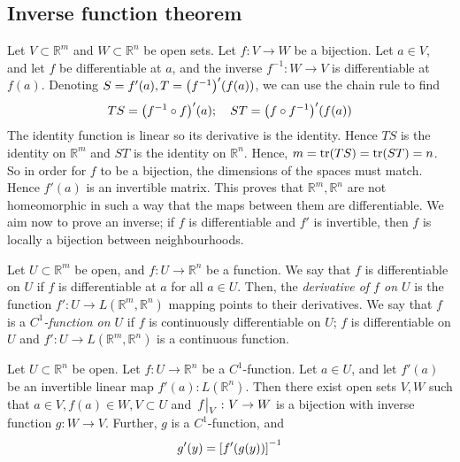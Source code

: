 \subsection{Inverse function theorem}
\begin{remark}
	Let \( V \subset \mathbb R^m \) and \( W \subset \mathbb R^n \) be open sets.
	Let \( f \colon V \to W \) be a bijection.
	Let \( a \in V \), and let \( f \) be differentiable at \( a \), and the inverse \( f^{-1} \colon W \to V \) is differentiable at \( f(a) \).
	Denoting \( S = f'(a), T = \qty(f^{-1})'(f(a)) \), we can use the chain rule to find
	\[
		TS = \qty(f^{-1} \circ f)'(a);\quad ST = \qty(f \circ f^{-1})'(f(a))
	\]
	The identity function is linear so its derivative is the identity.
	Hence \( TS \) is the identity on \( \mathbb R^m \) and \( ST \) is the identity on \( \mathbb R^n \).
	Hence, \( m = \tr(TS) = \tr(ST) = n \).
	So in order for \( f \) to be a bijection, the dimensions of the spaces must match.
	Hence \( f'(a) \) is an invertible matrix.
	This proves that \( \mathbb R^m, \mathbb R^n \) are not homeomorphic in such a way that the maps between them are differentiable.
	We aim now to prove an inverse; if \( f \) is differentiable and \( f' \) is invertible, then \( f \) is locally a bijection between neighbourhoods.
\end{remark}
\begin{definition}
	Let \( U \subset \mathbb R^m \) be open, and \( f \colon U \to \mathbb R^n \) be a function.
	We say that \( f \) is differentiable on \( U \) if \( f \) is differentiable at \( a \) for all \( a \in U \).
	Then, the \textit{derivative of \( f \) on \( U \)} is the function \( f' \colon U \to L(\mathbb R^m, \mathbb R^n) \) mapping points to their derivatives.
	We say that \( f \) is a \textit{\( C^1 \)-function on \( U \)} if \( f \) is continuously differentiable on \( U \); \( f \) is differentiable on \( U \) and \( f' \colon U \to L(\mathbb R^m, \mathbb R^n) \) is a continuous function.
\end{definition}
\begin{theorem}
	Let \( U \subset \mathbb R^n \) be open.
	Let \( f \colon U \to \mathbb R^n \) be a \( C^1 \)-function.
	Let \( a \in U \), and let \( f'(a) \) be an invertible linear map \( f'(a) \colon L(\mathbb R^n) \).
	Then there exist open sets \( V, W \) such that \( a \in V, f(a) \in W, V \subset U \) and \( \eval{f}_V \colon V \to W \) is a bijection with inverse function \( g\colon W \to V \).
	Further, \( g \) is a \( C^1 \)-function, and
	\[
		g'(y) = \qty[f'(g(y))]^{-1}
	\]
\end{theorem}
